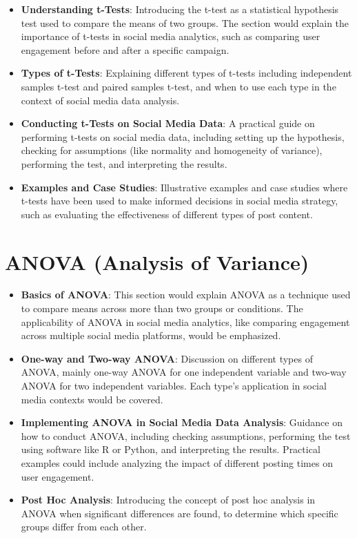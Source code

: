 \documentclass[
]{book}
\providecommand{\tightlist}{%
  \setlength{\itemsep}{0pt}\setlength{\parskip}{0pt}}
\begin{document}
\begin{itemize}
\tightlist
\item
  \textbf{Understanding t-Tests}: Introducing the t-test as a statistical hypothesis test used to compare the means of two groups. The section would explain the importance of t-tests in social media analytics, such as comparing user engagement before and after a specific campaign.
\item
  \textbf{Types of t-Tests}: Explaining different types of t-tests including independent samples t-test and paired samples t-test, and when to use each type in the context of social media data analysis.
\item
  \textbf{Conducting t-Tests on Social Media Data}: A practical guide on performing t-tests on social media data, including setting up the hypothesis, checking for assumptions (like normality and homogeneity of variance), performing the test, and interpreting the results.
\item
  \textbf{Examples and Case Studies}: Illustrative examples and case studies where t-tests have been used to make informed decisions in social media strategy, such as evaluating the effectiveness of different types of post content.
\end{itemize}

\hypertarget{anova-analysis-of-variance}{%
\section*{ANOVA (Analysis of Variance)}\label{anova-analysis-of-variance}}

\begin{itemize}
\tightlist
\item
  \textbf{Basics of ANOVA}: This section would explain ANOVA as a technique used to compare means across more than two groups or conditions. The applicability of ANOVA in social media analytics, like comparing engagement across multiple social media platforms, would be emphasized.
\item
  \textbf{One-way and Two-way ANOVA}: Discussion on different types of ANOVA, mainly one-way ANOVA for one independent variable and two-way ANOVA for two independent variables. Each type's application in social media contexts would be covered.
\item
  \textbf{Implementing ANOVA in Social Media Data Analysis}: Guidance on how to conduct ANOVA, including checking assumptions, performing the test using software like R or Python, and interpreting the results. Practical examples could include analyzing the impact of different posting times on user engagement.
\item
  \textbf{Post Hoc Analysis}: Introducing the concept of post hoc analysis in ANOVA when significant differences are found, to determine which specific groups differ from each other.
\end{itemize}
\end{document}
